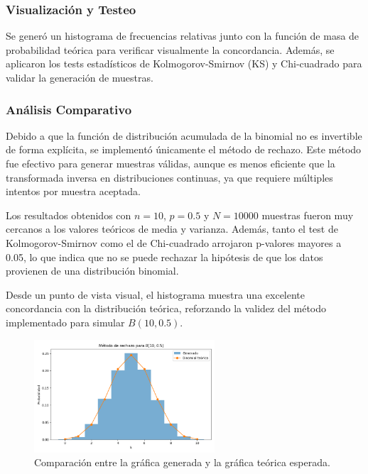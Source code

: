 \documentclass{article}
\begin{document}
\vspace{0.5em}
\subsubsection{Visualización y Testeo}
Se generó un histograma de frecuencias relativas junto con la función de masa de probabilidad teórica para verificar visualmente la concordancia. Además, se aplicaron los tests estadísticos de Kolmogorov-Smirnov (KS) y Chi-cuadrado para validar la generación de muestras.

\vspace{0.5em}
\subsubsection{Análisis Comparativo}
Debido a que la función de distribución acumulada de la binomial no es invertible de forma explícita, se implementó únicamente el método de rechazo. Este método fue efectivo para generar muestras válidas, aunque es menos eficiente que la transformada inversa en distribuciones continuas, ya que requiere múltiples intentos por muestra aceptada.

Los resultados obtenidos con $n=10$, $p=0.5$ y $N=10000$ muestras fueron muy cercanos a los valores teóricos de media y varianza. Además, tanto el test de Kolmogorov-Smirnov como el de Chi-cuadrado arrojaron p-valores mayores a 0.05, lo que indica que no se puede rechazar la hipótesis de que los datos provienen de una distribución binomial.

Desde un punto de vista visual, el histograma muestra una excelente concordancia con la distribución teórica, reforzando la validez del método implementado para simular $B(10, 0.5)$.

\begin{figure}[H]
    \centering
    \includegraphics[width=0.6\textwidth]{visualizaciones/binomial_rechazo.png}
    \caption{Comparación entre la gráfica generada y la gráfica teórica esperada.}
    \label{fig:binomial_rechazo}
\end{figure}
\end{document}
